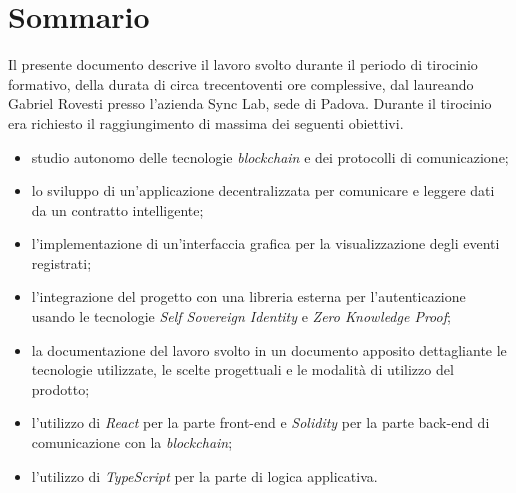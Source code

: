 \cleardoublepage{}
\begingroup
\let\clearpage\relax
\let\cleardoublepage\relax
\let\cleardoublepage\relax

\chapter*{Sommario}

Il presente documento descrive il lavoro svolto durante il periodo di tirocinio formativo, della durata di circa trecentoventi ore complessive, dal laureando Gabriel Rovesti presso l'azienda Sync Lab, sede di Padova.
Durante il tirocinio era richiesto il raggiungimento di massima dei seguenti obiettivi.
\begin{itemize}
    \item studio autonomo delle tecnologie \textit{blockchain} e dei protocolli di comunicazione;
    \item lo sviluppo di un'applicazione decentralizzata per comunicare e leggere dati da un contratto intelligente;
    \item l'implementazione di un'interfaccia grafica per la visualizzazione degli eventi registrati;
    \item l'integrazione del progetto con una libreria esterna per l'autenticazione usando le tecnologie \textit{Self Sovereign Identity} e \textit{Zero Knowledge Proof};
    \item la documentazione del lavoro svolto in un documento apposito dettagliante le tecnologie utilizzate, le scelte progettuali e le modalità di utilizzo del prodotto;
    \item l'utilizzo di \textit{React} per la parte front-end e \textit{Solidity} per la parte back-end di comunicazione con la \textit{blockchain};
    \item l'utilizzo di \textit{TypeScript} per la parte di logica applicativa.
\end{itemize}

\endgroup

\vfill
